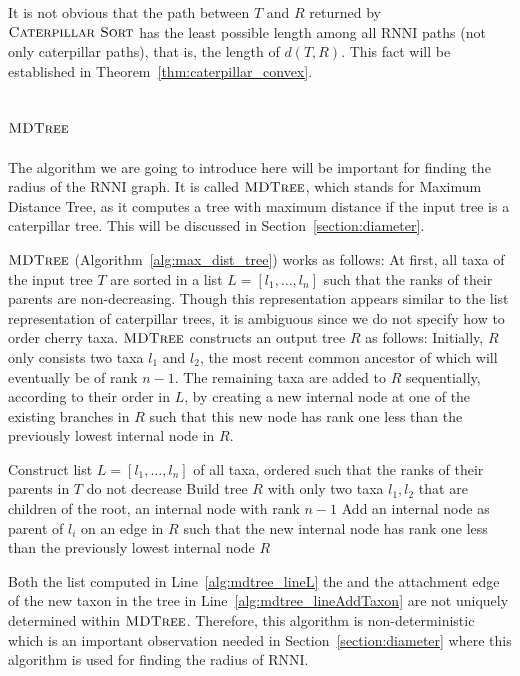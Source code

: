 \documentclass{amsart}
\newcommand{\rnni}{\mathrm{RNNI}}
\newcommand{\csort}{\textsc{Caterpillar Sort}}
\newcommand{\mdtree}{\textsc{MDTree}}
\begin{document}
It is not obvious that the path between $T$ and $R$ returned by $\csort$ has the least possible length among all $\rnni$ paths (not only caterpillar paths), that is, the length of $d(T, R)$.
This fact will be established in Theorem~\ref{thm:caterpillar_convex}.

\subsection{$\mdtree$}
\label{section:alg_mdtree}

The algorithm we are going to introduce here will be important for finding the radius of the $\rnni$ graph.
It is called $\mdtree$, which stands for Maximum Distance Tree, as it computes a tree with maximum distance if the input tree is a caterpillar tree.
This will be discussed in Section~\ref{section:diameter}.

$\mdtree$ (Algorithm~\ref{alg:max_dist_tree}) works as follows:
At first, all taxa of the input tree $T$ are sorted in a list $L = [l_1, \ldots, l_n]$ such that the ranks of their parents are non-decreasing.
Though this representation appears similar to the list representation of caterpillar trees, it is ambiguous since we do not specify how to order cherry taxa.
$\mdtree$ constructs an output tree $R$ as follows:
Initially, $R$ only consists two taxa $l_1$ and $l_2$, the most recent common ancestor of which will eventually be of rank $n - 1$.
The remaining taxa are added to $R$ sequentially, according to their order in $L$, by creating a new internal node at one of the existing branches in $R$ such that this new node has rank one less than the previously lowest internal node in $R$.

\begin{algorithm}[H]
\caption{$\mdtree(T)$}
\label{alg:max_dist_tree}
\begin{algorithmic}[1]
\STATE Construct list $L=[l_1, \ldots, l_n]$ of all taxa, ordered such that the ranks of their parents in $T$ do not decrease \label{alg:mdtree_lineL}
\STATE Build tree $R$ with only two taxa $l_1, l_2$ that are children of the root, an internal node with rank $n-1$
\STATE Add an internal node as parent of $l_i$ on an edge in $R$ such that the new internal node has rank one less than the previously lowest internal node \label{alg:mdtree_lineAddTaxon}
\ENDFOR
\RETURN $R$
\end{algorithmic}
\end{algorithm}

Both the list computed in Line~\ref{alg:mdtree_lineL} the and the attachment edge of the new taxon in the tree in Line~\ref{alg:mdtree_lineAddTaxon} are not uniquely determined within $\mdtree$.
Therefore, this algorithm is non-deterministic which is an important observation needed in Section~\ref{section:diameter} where this algorithm is used for finding the radius of $\rnni$.
\end{document}
